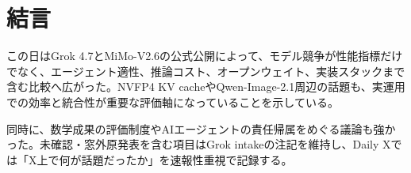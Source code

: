\section*{結言}
この日はGrok 4.7とMiMo-V2.6の公式公開によって、モデル競争が性能指標だけでなく、エージェント適性、推論コスト、オープンウェイト、実装スタックまで含む比較へ広がった。NVFP4 KV cacheやQwen-Image-2.1周辺の話題も、実運用での効率と統合性が重要な評価軸になっていることを示している。

同時に、数学成果の評価制度やAIエージェントの責任帰属をめぐる議論も強かった。未確認・窓外原発表を含む項目はGrok intakeの注記を維持し、Daily Xでは「X上で何が話題だったか」を速報性重視で記録する。
